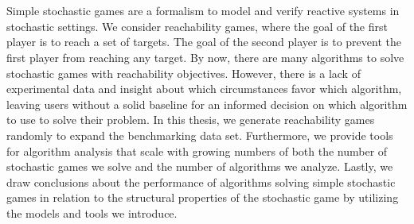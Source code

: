 \chapter*{\abstractname}
Simple stochastic games are a formalism to model and verify reactive systems in stochastic settings.
We consider reachability games, where the goal of the first player is to reach a set of targets.
The goal of the second player is to prevent the first player from reaching any target.
By now, there are many algorithms to solve stochastic games with reachability objectives.
However, there is a lack of experimental data and insight about which circumstances favor which algorithm, 
leaving users without a solid baseline for an informed decision on which algorithm to use to solve their problem.
In this thesis, we generate reachability games randomly to expand the benchmarking data set.
Furthermore, we provide tools for algorithm analysis that scale
with growing numbers of both the number of stochastic games we solve and the number of algorithms we analyze.
Lastly, we draw conclusions about the performance of algorithms solving simple stochastic games in relation 
to the structural properties of the stochastic game by utilizing the models and tools we introduce.